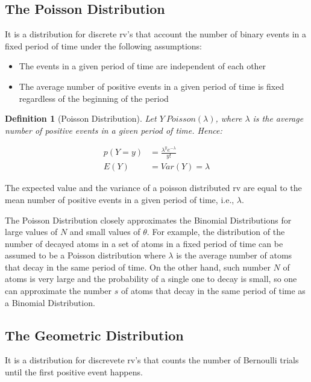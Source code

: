 \documentclass{article}
\newtheorem{definition}{Definition}[section]
\begin{document}
\subsection{The Poisson Distribution}

It is a distribution for discrete rv's that account the number of binary events in a fixed period of time under the following assumptions:

\begin{itemize}
	\item The events in a given period of time are independent of each other
	\item The average number of positive events in a given period of time is fixed regardless of the beginning of the period
\end{itemize}

\begin{definition}[Poisson Distribution]
	Let $ Y ~ Poisson(\lambda)$, where $\lambda$ is the average number of positive events in a given period of time. Hence:
	
	\begin{align}
		p(Y = y) & = \frac{\lambda^ye^{-\lambda}}{y!} \\
		E(Y) &= Var(Y) = \lambda
	\end{align}
\end{definition}

The expected value and the variance of a poisson distributed rv are equal to the mean number of positive events in a given period of time, i.e., $\lambda$.

The Poisson Distribution closely approximates the Binomial Distributions for large values of $N$ and small values of $\theta$. For example, the distribution of the number of decayed atoms in a set of atoms in a fixed period of time can be assumed to be a Poisson distribution where $\lambda$ is the average number of atoms that decay in the same period of time. On the other hand, such number $N$ of atoms is very large and the probability of a single one to decay is small, so one can approximate the  number $s$ of atoms that decay in the same period of time as a Binomial Distribution.


\subsection{The Geometric Distribution}

It is a distribution for discrevete rv's that counts the number of Bernoulli trials until the first positive event happens.
\end{document}
